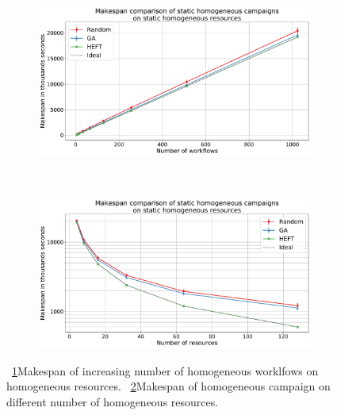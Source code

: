 \begin{figure}[ht!]
    \centering
    \begin{subfigure}[b]{0.45\textwidth}
        \includegraphics[width=.95\textwidth]{figures/campaign/StHomoCampaigns_4StHomoResources.pdf}
        \caption{}
        \label{fig:StHomoCampaigns_4StHomoResources}
    \end{subfigure}%
    ~ 
    \begin{subfigure}[b]{0.45\textwidth}
        \includegraphics[width=\linewidth]{figures/campaign/StHomoResources_StHomoCampaigns.pdf}
        \caption{}
        \label{fig:StHomoResources_StHomoCampaigns}
    \end{subfigure}
    \caption{~\ref{fig:StHomoCampaigns_4StHomoResources}Makespan of increasing number of homogeneous worklfows on homogeneous resources.
        ~\ref{fig:StHomoResources_StHomoCampaigns}Makespan of homogeneous campaign on different number of homogeneous resources.}
    \label{fig:dyn_homog_analysis}
\end{figure}




